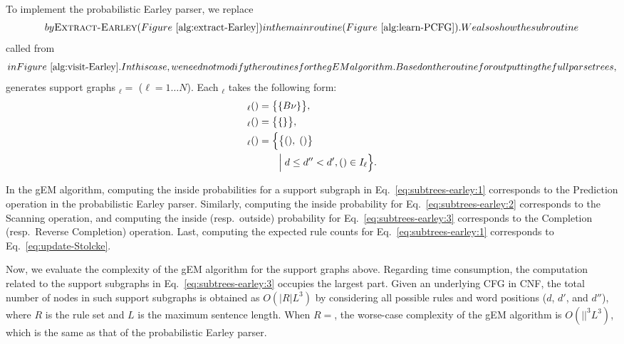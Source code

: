 \documentclass[english]{jnlp_1.4_rep}
\newcommand{\tuple}[1]{}
\newcommand{\Vn}{}
\newcommand{\dto}{}
\newcommand{\subtrees}{}
\newcommand{\Rmax}{}
\newcommand{\sg}{}
\newcommand{\proc}[1]{}
\newcommand{\es}[3]{}
\begin{document}
To implement the probabilistic Earley parser, we replace
    $\proc{Extract-CYK}$ by \textsc{Extract-Earley}
(Figure~\ref{alg:extract-Earley}) in the main routine
(Figure~\ref{alg:learn-PCFG}). We also show the subroutine
$\proc{Visit-Earley}$ called from $\proc{Extract-Earley}$ in
Figure~\ref{alg:visit-Earley}.  In this case, we need not
modify the routines for the gEM algorithm.
Based on the routine for outputting the full parse trees,
$\proc{Extract-Earley}$ generates support graphs
$\sg_\ell=\tuple{O_\ell,\subtrees_\ell}$ ($\ell=1\ldots N$).
Each $\subtrees_\ell$ takes the following form:
\begin{align}
\subtrees_\ell(\es{d}{d}{B\dto.\nu}) & = \bigl\{\{B\dto\nu\}\bigr\},
	\label{eq:subtrees-earley:1}\\
\subtrees_\ell(\es{d'}{d}{A\dto\zeta w_{d'}^{(\ell)}.\xi}) & = 
			\bigl\{\{\es{(d'-1)}{d}{A\dto\zeta.w_{d'}^{(\ell)}\xi}\}\bigr\},
	\label{eq:subtrees-earley:2}\\
\subtrees_\ell(\es{d'}{d}{A\dto\zeta B.\xi}) & = 
				\Bigl\{
					\bigl\{
						(\es{d''}{d}{A\dto\zeta.B\xi}),\;
						(\es{d'}{d''}{B\dto\nu.})
					\bigr\}\nonumber\\
		& \qquad \Big|\;
					d\le d''< d',
					(\es{d'}{d''}{B\to\nu.})\in I_\ell
				\Bigr\}.
	\label{eq:subtrees-earley:3}
\end{align}

In the gEM algorithm, computing the inside probabilities
for a support subgraph in Eq.~\ref{eq:subtrees-earley:1} corresponds to
the Prediction operation in the probabilistic Earley parser.
Similarly, computing the inside probability for
Eq.~\ref{eq:subtrees-earley:2} corresponds to the Scanning operation,
and computing the inside (resp.\ outside) probability
for Eq.~\ref{eq:subtrees-earley:3} corresponds to the Completion
(resp.\ Reverse Completion) operation.  Last, computing the
expected rule counts for Eq.~\ref{eq:subtrees-earley:1}
corresponds to Eq.~\ref{eq:update-Stolcke}.

Now, we evaluate the complexity of the gEM algorithm for the support graphs
above.  Regarding time consumption, the computation related to the
support subgraphs in Eq.~\ref{eq:subtrees-earley:3} occupies
the largest part.  Given an underlying CFG in CNF,
the total number of nodes in such support subgraphs is obtained as
$O(|R|L^3)$ by considering all possible rules and word positions
($d$, $d'$, and $d''$), where $R$ is the rule set and $L$ is
the maximum sentence length.  When $R=\Rmax$,
the worse-case complexity of the gEM algorithm is $O(|\Vn|^3 L^3)$,
which is the same as that of the probabilistic Earley parser.
\end{document}
